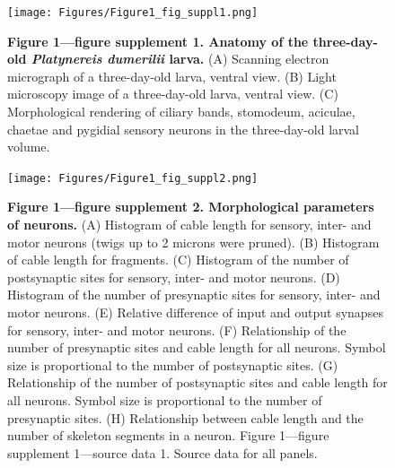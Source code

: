 \documentclass[
  11pt,
]{article}
\begin{document}
\begin{figure}[H]

{\centering \texttt{[image: Figures/Figure1\_fig\_suppl1.png]}

}

\caption{\textbf{Figure 1---figure supplement 1. Anatomy of the
three-day-old \emph{Platynereis dumerilii} larva.} (A) Scanning electron
micrograph of a three-day-old larva, ventral view. (B) Light microscopy
image of a three-day-old larva, ventral view. (C) Morphological
rendering of ciliary bands, stomodeum, aciculae, chaetae and pygidial
sensory neurons in the three-day-old larval volume.}

\end{figure}%

\begin{figure}[H]

{\centering \texttt{[image: Figures/Figure1\_fig\_suppl2.png]}

}

\caption{\textbf{Figure 1---figure supplement 2. Morphological
parameters of neurons.} (A) Histogram of cable length for sensory,
inter- and motor neurons (twigs up to 2 microns were pruned). (B)
Histogram of cable length for fragments. (C) Histogram of the number of
postsynaptic sites for sensory, inter- and motor neurons. (D) Histogram
of the number of presynaptic sites for sensory, inter- and motor
neurons. (E) Relative difference of input and output synapses for
sensory, inter- and motor neurons. (F) Relationship of the number of
presynaptic sites and cable length for all neurons. Symbol size is
proportional to the number of postsynaptic sites. (G) Relationship of
the number of postsynaptic sites and cable length for all neurons.
Symbol size is proportional to the number of presynaptic sites. (H)
Relationship between cable length and the number of skeleton segments in
a neuron. Figure 1---figure supplement 1---source data 1. Source data
for all panels.}

\end{figure}%
\end{document}
